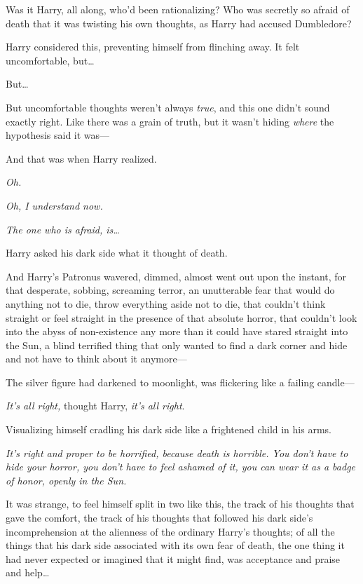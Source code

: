 Was it Harry, all along, who'd been rationalizing? Who was secretly so afraid of death that it was twisting his own thoughts, as Harry had accused Dumbledore?

Harry considered this, preventing himself from flinching away. It felt uncomfortable, but{\ldots}

But{\ldots}

But uncomfortable thoughts weren't always \emph{true}, and this one didn't sound exactly right. Like there was a grain of truth, but it wasn't hiding \emph{where} the hypothesis said it was—

And that was when Harry realized.

\emph{Oh.}

\emph{Oh, I understand now.}

\emph{The one who is afraid, is{\ldots}}

Harry asked his dark side what it thought of death.

And Harry's Patronus wavered, dimmed, almost went out upon the instant, for that desperate, sobbing, screaming terror, an unutterable fear that would do anything not to die, throw everything aside not to die, that couldn't think straight or feel straight in the presence of that absolute horror, that couldn't look into the abyss of non-existence any more than it could have stared straight into the Sun, a blind terrified thing that only wanted to find a dark corner and hide and not have to think about it anymore—

The silver figure had darkened to moonlight, was flickering like a failing candle—

\emph{It's all right,} thought Harry, \emph{it's all right}.

Visualizing himself cradling his dark side like a frightened child in his arms.

\emph{It's right and proper to be horrified, because death is horrible. You don't have to hide your horror, you don't have to feel ashamed of it, you can wear it as a badge of honor, openly in the Sun.}

It was strange, to feel himself split in two like this, the track of his thoughts that gave the comfort, the track of his thoughts that followed his dark side's incomprehension at the alienness of the ordinary Harry's thoughts; of all the things that his dark side associated with its own fear of death, the one thing it had never expected or imagined that it might find, was acceptance and praise and help{\ldots}

